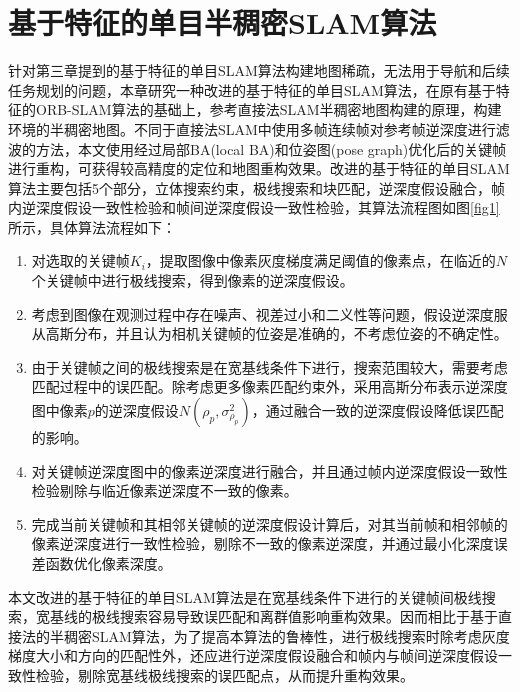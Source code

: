 
\chapter{基于特征的单目半稠密SLAM算法}
\label{chap:Semi-Dense}

针对第三章提到的基于特征的单目SLAM算法构建地图稀疏，无法用于导航和后续任务规划的问题，本章研究一种改进的基于特征的单目SLAM算法，在原有基于特征的ORB-SLAM算法的基础上，参考直接法SLAM半稠密地图构建的原理，构建环境的半稠密地图。不同于直接法SLAM中使用多帧连续帧对参考帧逆深度进行滤波的方法，本文使用经过局部BA(local BA)和位姿图(pose graph)优化后的关键帧进行重构，可获得较高精度的定位和地图重构效果。改进的基于特征的单目SLAM算法主要包括5个部分，立体搜索约束，极线搜索和块匹配，逆深度假设融合，帧内逆深度假设一致性检验和帧间逆深度假设一致性检验，其算法流程图如图\ref{fig1}所示，具体算法流程如下：
\begin{enumerate}[label={(\arabic*)}]

\item 对选取的关键帧$K_i$，提取图像中像素灰度梯度满足阈值的像素点，在临近的$N$个关键帧中进行极线搜索，得到像素的逆深度假设。

\item 考虑到图像在观测过程中存在噪声、视差过小和二义性等问题，假设逆深度服从高斯分布，并且认为相机关键帧的位姿是准确的，不考虑位姿的不确定性。

\item 由于关键帧之间的极线搜索是在宽基线条件下进行，搜索范围较大，需要考虑匹配过程中的误匹配。除考虑更多像素匹配约束外，采用高斯分布表示逆深度图中像素$p$的逆深度假设$N(\rho_p, \sigma_{\rho_p}^2)$，通过融合一致的逆深度假设降低误匹配的影响。

\item 对关键帧逆深度图中的像素逆深度进行融合，并且通过帧内逆深度假设一致性检验剔除与临近像素逆深度不一致的像素。

\item 完成当前关键帧和其相邻关键帧的逆深度假设计算后，对其当前帧和相邻帧的像素逆深度进行一致性检验，剔除不一致的像素逆深度，并通过最小化深度误差函数优化像素深度。

\end{enumerate}

本文改进的基于特征的单目SLAM算法是在宽基线条件下进行的关键帧间极线搜索，宽基线的极线搜索容易导致误匹配和离群值影响重构效果。因而相比于基于直接法的半稠密SLAM算法，为了提高本算法的鲁棒性，进行极线搜索时除考虑灰度梯度大小和方向的匹配性外，还应进行逆深度假设融合和帧内与帧间逆深度假设一致性检验，剔除宽基线极线搜索的误匹配点，从而提升重构效果。

